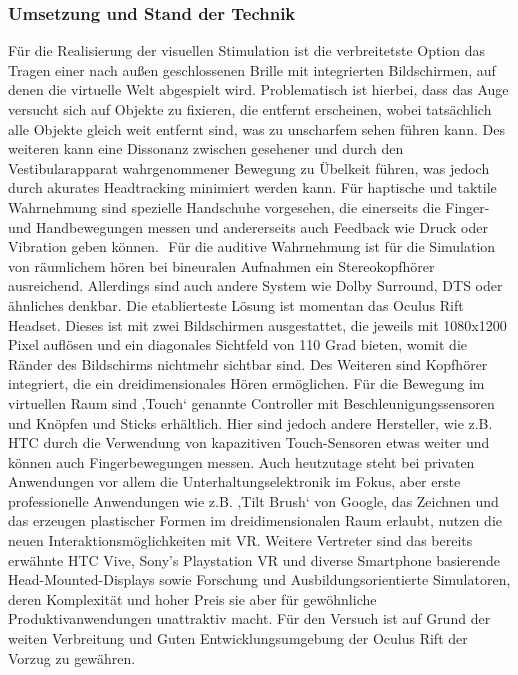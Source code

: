 \documentclass[12pt,a4paper,bibliography=totocnumbered,listof=totocnumbered]{scrartcl}
\begin{document}
\subsubsection{Umsetzung und Stand der Technik}
Für die Realisierung der visuellen Stimulation ist die verbreitetste Option das Tragen einer nach außen geschlossenen Brille mit integrierten Bildschirmen, auf denen die virtuelle Welt abgespielt wird. Problematisch ist hierbei, dass das Auge versucht sich auf Objekte zu fixieren, die entfernt erscheinen, wobei tatsächlich alle Objekte gleich weit entfernt sind, was zu unscharfem sehen führen kann. Des weiteren kann eine Dissonanz zwischen gesehener und durch den Vestibularapparat wahrgenommener Bewegung zu Übelkeit führen, was jedoch durch akurates Headtracking minimiert werden kann. Für haptische und taktile Wahrnehmung sind spezielle Handschuhe vorgesehen, die einerseits die Finger- und Handbewegungen messen und andererseits auch Feedback wie Druck oder Vibration geben können.
 Für die auditive Wahrnehmung ist für die Simulation von räumlichem hören bei bineuralen Aufnahmen ein Stereokopfhörer ausreichend. Allerdings sind auch andere System wie Dolby Surround, DTS oder ähnliches denkbar. Die etablierteste Lösung ist momentan das Oculus Rift Headset. Dieses ist mit zwei Bildschirmen ausgestattet, die jeweils mit 1080x1200 Pixel auflösen und ein diagonales Sichtfeld von 110 Grad bieten, womit die Ränder des Bildschirms nichtmehr sichtbar sind. Des Weiteren sind Kopfhörer integriert, die ein dreidimensionales Hören ermöglichen. Für die Bewegung im virtuellen Raum sind ‚Touch‘ genannte Controller mit Beschleunigungssensoren und Knöpfen und Sticks erhältlich. Hier sind jedoch andere Hersteller, wie z.B. HTC durch die Verwendung von kapazitiven Touch-Sensoren etwas weiter und können auch Fingerbewegungen messen. Auch heutzutage steht bei privaten Anwendungen vor allem die Unterhaltungselektronik im Fokus, aber erste professionelle Anwendungen wie z.B. ‚Tilt Brush‘ von Google, das Zeichnen und das erzeugen plastischer Formen im dreidimensionalen Raum erlaubt, nutzen die neuen Interaktionsmöglichkeiten mit VR. Weitere Vertreter sind das bereits erwähnte HTC Vive, Sony’s Playstation VR und diverse Smartphone basierende Head-Mounted-Displays sowie Forschung und Ausbildungsorientierte Simulatoren, deren Komplexität und hoher Preis sie aber für gewöhnliche Produktivanwendungen unattraktiv macht. Für den Versuch ist auf Grund der weiten Verbreitung und Guten Entwicklungsumgebung der Oculus Rift der Vorzug zu gewähren.
\end{document}
